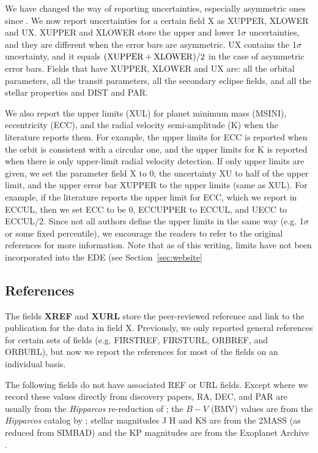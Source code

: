 \documentclass[11pt,preprint]{aastex}
\begin{document}
\begin{CJK*}{UTF8}{gbsn}
We have changed the way of reporting uncertainties, especially
asymmetric ones since \cite{Wright2011}. We now report
uncertainties for a certain field X as XUPPER, XLOWER and UX. XUPPER
and XLOWER store the upper and lower 1$\sigma$ uncertainties, and they
are different when the error bars are asymmetric. UX contains the
1$\sigma$ uncertainty, and it equals $({\rm XUPPER+XLOWER})/2$ in
the case of asymmetric error bars. Fields that have XUPPER, XLOWER and
UX are: all the orbital parameters, all the transit parameters, all the
secondary eclipse fields, and all the stellar
properties and DIST and PAR.

We also report the upper limits (XUL) for planet minimum mass (MSINI),
eccentricity (ECC), and the radial velocity semi-amplitude (K) when
the literature reports them. For example, the upper limits for ECC is
reported when the orbit is consistent with a circular one, and the
upper limits for K is reported when there is only upper-limit radial
velocity detection. If only upper limits are given, we set the
parameter field X to 0, the uncertainty XU to half of the upper limit,
and the upper error bar XUPPER to the upper limits (same as XUL). For
example, if the literature reports the upper limit for ECC, which we
report in ECCUL, then we set ECC to be 0, ECCUPPER to ECCUL, and UECC
to ECCUL/2. Since not all authors define the upper limits in the same
way (e.g. 1$\sigma$ or some fixed percentile), we encourage the
readers to refer to the original references for more information. Note that as of this writing, limits have not been incorporated into the EDE (see Section~\ref{sec:website}


\subsection{References}\label{sec:ref}

The fields {\bf XREF} and {\bf XURL} store the peer-reviewed reference
and link to the publication for the data in field X. Previously, we only
reported general references for certain sets of fields (e.g. FIRSTREF,
FIRSTURL, ORBREF, and ORBURL), but now we report the references for
most of the fields on an individual basis.

The following fields do not have associated REF or URL fields. Except where we record these values directly from discovery papers, RA, DEC, and PAR are usually from the \textit{Hipparcos} re-reduction of \cite{van Leeuwen2009}; the $B-V$ (BMV) values
are from the \textit{Hipparcos} catalog by \cite{Perryman1997};
stellar magnitudes J H and KS are from the 2MASS
\citep{Skrutskie2006} (as reduced from SIMBAD) and the KP magnitudes are from the Exoplanet
Archive \citep{Akeson2013}.


\end{CJK*}
\end{document}
